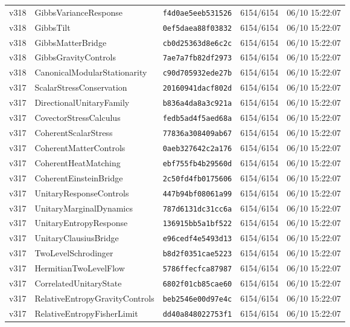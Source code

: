 \documentclass[11pt]{article}
\theoremstyle{definition}\newtheorem{deriv}{Derivação}
\begin{document}
{\begin{longtable}{@{}lllll@{}}
v318 & GibbsVarianceResponse & \texttt{f4d0ae5eeb531526} & 6154/6154 & 06/10 15:22:07 \\
v318 & GibbsTilt & \texttt{0ef5daea88f03832} & 6154/6154 & 06/10 15:22:07 \\
v318 & GibbsMatterBridge & \texttt{cb0d25363d8e6c2c} & 6154/6154 & 06/10 15:22:07 \\
v318 & GibbsGravityControls & \texttt{7ae7a7fb82df2973} & 6154/6154 & 06/10 15:22:07 \\
v318 & CanonicalModularStationarity & \texttt{c90d705932ede27b} & 6154/6154 & 06/10 15:22:07 \\
v317 & ScalarStressConservation & \texttt{20160941dacf802d} & 6154/6154 & 06/10 15:22:07 \\
v317 & DirectionalUnitaryFamily & \texttt{b836a4da8a3c921a} & 6154/6154 & 06/10 15:22:07 \\
v317 & CovectorStressCalculus & \texttt{fedb5ad4f5aed68a} & 6154/6154 & 06/10 15:22:07 \\
v317 & CoherentScalarStress & \texttt{77836a308409ab67} & 6154/6154 & 06/10 15:22:07 \\
v317 & CoherentMatterControls & \texttt{0aeb327642c2a176} & 6154/6154 & 06/10 15:22:07 \\
v317 & CoherentHeatMatching & \texttt{ebf755fb4b29560d} & 6154/6154 & 06/10 15:22:07 \\
v317 & CoherentEinsteinBridge & \texttt{2c50fd4fb0175606} & 6154/6154 & 06/10 15:22:07 \\
v317 & UnitaryResponseControls & \texttt{447b94bf08061a99} & 6154/6154 & 06/10 15:22:07 \\
v317 & UnitaryMarginalDynamics & \texttt{787d6131dc31cc6a} & 6154/6154 & 06/10 15:22:07 \\
v317 & UnitaryEntropyResponse & \texttt{136915bb5a1bf522} & 6154/6154 & 06/10 15:22:07 \\
v317 & UnitaryClausiusBridge & \texttt{e96cedf4e5493d13} & 6154/6154 & 06/10 15:22:07 \\
v317 & TwoLevelSchrodinger & \texttt{b8d2f0351cae5223} & 6154/6154 & 06/10 15:22:07 \\
v317 & HermitianTwoLevelFlow & \texttt{5786ffecfca87987} & 6154/6154 & 06/10 15:22:07 \\
v317 & CorrelatedUnitaryState & \texttt{6802f01cb85cae60} & 6154/6154 & 06/10 15:22:07 \\
v317 & RelativeEntropyGravityControls & \texttt{beb2546e00d97e4c} & 6154/6154 & 06/10 15:22:07 \\
v317 & RelativeEntropyFisherLimit & \texttt{dd40a848022753f1} & 6154/6154 & 06/10 15:22:07 \\

\end{longtable}}
\end{document}
